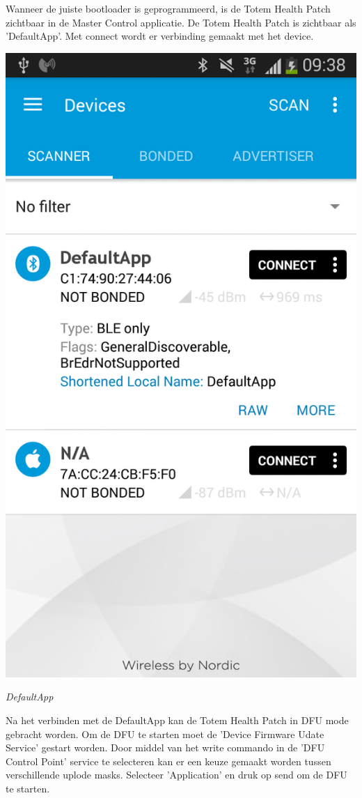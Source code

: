 \documentclass[conference]{IEEEtran}
\begin{document}
Wanneer de juiste bootloader is geprogrammeerd, is de Totem Health Patch zichtbaar in de Master Control applicatie. De Totem Health Patch is zichtbaar als 'DefaultApp'. Met connect wordt er verbinding gemaakt met het device.

\begin{center}
    \includegraphics[scale=0.3]{FOTA1}
    \begin{minipage}{0.6\textwidth}
    \footnotesize
    \emph{DefaultApp}
    \end{minipage}
\end{center}
\newpage
Na het verbinden met de DefaultApp kan de Totem Health Patch in DFU mode gebracht worden. Om de DFU te starten moet de 'Device Firmware Udate Service' gestart worden. Door middel van het write commando in de 'DFU Control Point' service te selecteren kan er een keuze gemaakt worden tussen verschillende uplode masks. Selecteer 'Application' en druk op send om de DFU te starten. 
\end{document}
